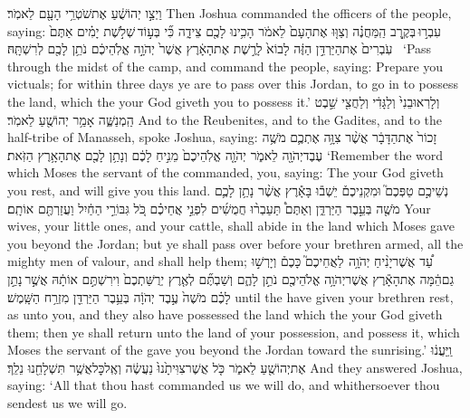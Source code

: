 {וַיְצַ֣ו יְהוֹשֻׁ֔עַ אֶת\maqqaf שֹׁטְרֵ֥י הָעָ֖ם לֵאמֹֽר׃}
{Then Joshua commanded the officers of the people, saying:}
{עִבְר֣וּ \legarmeh  בְּקֶ֣רֶב הַֽמַּחֲנֶ֗ה וְצַוּ֤וּ אֶת\maqqaf הָעָם֙ לֵאמֹ֔ר הָכִ֥ינוּ לָכֶ֖ם צֵידָ֑ה כִּ֞י בְּע֣וֹד \legarmeh  שְׁלֹ֣שֶׁת יָמִ֗ים אַתֶּם֙ עֹֽבְרִים֙ אֶת\maqqaf הַיַּרְדֵּ֣ן הַזֶּ֔ה לָבוֹא֙ לָרֶ֣שֶׁת אֶת\maqqaf הָאָ֔רֶץ אֲשֶׁר֙ יְהֹוָ֣ה אֱלֹֽהֵיכֶ֔ם נֹתֵ֥ן לָכֶ֖ם לְרִשְׁתָּֽהּ׃ \petucha }
{‘Pass through the midst of the camp, and command the people, saying: Prepare you victuals; for within three days ye are to pass over this Jordan, to go in to possess the land, which the \lord\space your God giveth you to possess it.’}
{וְלָרֽאוּבֵנִי֙ וְלַגָּדִ֔י וְלַחֲצִ֖י שֵׁ֣בֶט הַֽמְנַשֶּׁ֑ה אָמַ֥ר יְהוֹשֻׁ֖עַ לֵאמֹֽר׃}
{And to the Reubenites, and to the Gadites, and to the half-tribe of Manasseh, spoke Joshua, saying:}
{זָכוֹר֙ אֶת\maqqaf הַדָּבָ֔ר אֲשֶׁ֨ר צִוָּ֥ה אֶתְכֶ֛ם מֹשֶׁ֥ה עֶבֶד\maqqaf יְהֹוָ֖ה לֵאמֹ֑ר יְהֹוָ֤ה אֱלֹֽהֵיכֶם֙ מֵנִ֣יחַ לָכֶ֔ם וְנָתַ֥ן לָכֶ֖ם אֶת\maqqaf הָאָ֥רֶץ הַזֹּֽאת׃}
{‘Remember the word which Moses the servant of the \lord\space commanded, you, saying: The \lord\space your God giveth you rest, and will give you this land.}
{נְשֵׁיכֶ֣ם טַפְּכֶם֮ וּמִקְנֵיכֶם֒ יֵשְׁב֕וּ בָּאָ֕רֶץ אֲשֶׁ֨ר נָתַ֥ן לָכֶ֛ם מֹשֶׁ֖ה בְּעֵ֣בֶר הַיַּרְדֵּ֑ן וְאַתֶּם֩ תַּעַבְר֨וּ חֲמֻשִׁ֜ים לִפְנֵ֣י אֲחֵיכֶ֗ם כֹּ֚ל גִּבּוֹרֵ֣י הַחַ֔יִל וַעֲזַרְתֶּ֖ם אוֹתָֽם׃}
{Your wives, your little ones, and your cattle, shall abide in the land which Moses gave you beyond the Jordan; but ye shall pass over before your brethren armed, all the mighty men of valour, and shall help them;}
{עַ֠ד אֲשֶׁר\maqqaf יָנִ֨יחַ יְהֹוָ֥ה \pasek  לַאֲחֵיכֶם֮ כָּכֶם֒ וְיָרְשׁ֣וּ גַם\maqqaf הֵ֔מָּה אֶת\maqqaf הָאָ֕רֶץ אֲשֶׁר\maqqaf יְהֹוָ֥ה אֱלֹהֵיכֶ֖ם נֹתֵ֣ן לָהֶ֑ם וְשַׁבְתֶּ֞ם לְאֶ֤רֶץ יְרֻשַּׁתְכֶם֙ וִירִשְׁתֶּ֣ם אוֹתָ֔הּ אֲשֶׁ֣ר \legarmeh  נָתַ֣ן לָכֶ֗ם מֹשֶׁה֙ עֶ֣בֶד יְהֹוָ֔ה בְּעֵ֥בֶר הַיַּרְדֵּ֖ן מִזְרַ֥ח הַשָּֽׁמֶשׁ׃}
{until the \lord\space have given your brethren rest, as unto you, and they also have possessed the land which the \lord\space your God giveth them; then ye shall return unto the land of your possession, and possess it, which Moses the servant of the \lord\space gave you beyond the Jordan toward the sunrising.’}
{וַֽיַּעֲנ֔וּ אֶת\maqqaf יְהוֹשֻׁ֖עַ לֵאמֹ֑ר כֹּ֤ל אֲשֶׁר\maqqaf צִוִּיתָ֙נוּ֙ נַעֲשֶׂ֔ה וְאֶֽל\maqqaf כׇּל\maqqaf אֲשֶׁ֥ר תִּשְׁלָחֵ֖נוּ נֵלֵֽךְ׃}
{And they answered Joshua, saying: ‘All that thou hast commanded us we will do, and whithersoever thou sendest us we will go.}
